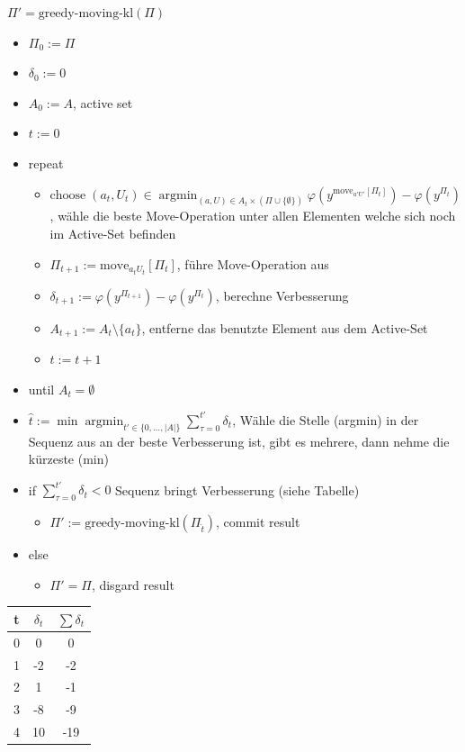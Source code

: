 \documentclass[12pt,a4paper]{article}
\DeclareMathOperator*{\argmin}{argmin}
\begin{document}
$\Pi' = \text{greedy-moving-kl}(\Pi)$
\begin{itemize}
\item $\Pi_0 := \Pi$
\item $\delta_0 := 0$
\item $A_0 := A$, active set
\item $t:=0$
\item repeat
\begin{itemize}
\item $\displaystyle \text{choose}\; (a_t,U_t) \in \argmin_{(a,U)\in A_t \times (\Pi \cup \{\emptyset\})}\varphi(y^{\text{move}_{a'U'}[\Pi_t]}) - \varphi(y^{\Pi_t})$, wähle die beste Move-Operation unter allen Elementen welche sich noch im Active-Set befinden
\item $\Pi_{t+1} := \text{move}_{a_t U_t}[\Pi_t]$, führe Move-Operation aus
\item $\delta_{t+1} := \varphi(y^{\Pi_{t+1}}) - \varphi(y^{\Pi_t})$, berechne Verbesserung
\item $A_{t+1} := A_t \setminus \{a_t\}$, entferne das benutzte Element aus dem Active-Set
\item $t:=t+1$
\end{itemize}
\item until $A_t = \emptyset$
\item $\displaystyle \hat{t} := \min \argmin_{t'\in\{0,...,|A|\}} \sum_{\tau = 0}^{t'} \delta_t$, Wähle die Stelle (argmin) in der Sequenz aus an der beste Verbesserung ist, gibt es mehrere, dann nehme die kürzeste (min)
\item if $\displaystyle \sum_{\tau = 0}^{t'} \delta_t < 0$ Sequenz bringt Verbesserung (siehe Tabelle)
\begin{itemize}
\item $\Pi' := \text{greedy-moving-kl}(\Pi_{\hat{t}})$, commit result
\end{itemize}
\item else
\begin{itemize}
\item $\Pi' = \Pi$, disgard result
\end{itemize}
\end{itemize}
\begin{tabular}{|c|c|c|}
\hline
t & $\delta_t$ & $\sum \delta_t$ \\
\hline
0 & 0 & 0\\
1 & -2 & -2\\
2 & 1 & -1\\
3 & -8 & -9\\
4 & 10 & -19\\
\end{tabular}
\end{document}
